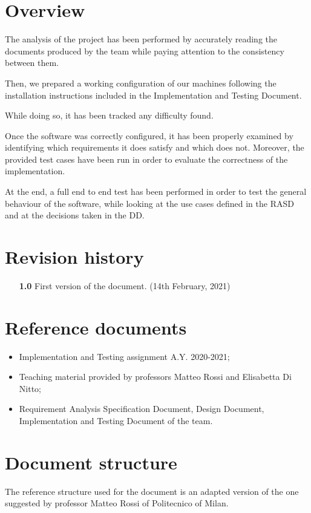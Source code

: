 \documentclass[a4paper,oneside,11pt]{book}
\begin{document}
    \section{Overview}
    The analysis of the project has been performed by accurately reading the documents produced by the team while paying attention to the consistency between them. \par
    Then, we prepared a working configuration of our machines following the installation instructions included in the Implementation and Testing Document. \par
    While doing so, it has been tracked any difficulty found. \par
    Once the software was correctly configured, it has been properly examined by identifying which requirements it does satisfy and which does not. Moreover, the provided test cases have been run in order to evaluate the correctness of the implementation. \par
    At the end, a full end to end test has been performed in order to test the general behaviour of the software, while looking at the use cases defined in the RASD and at the decisions taken in the DD.
    
    \section{Revision history}
    \begin{itemize}
        \item[\textbf{1.0}] First version of the document. (14th February, 2021)
    \end{itemize}
    
    \section{Reference documents}
    \begin{itemize}
        \item Implementation and Testing assignment A.Y. 2020-2021;
        \item Teaching material provided by professors Matteo Rossi and Elisabetta Di Nitto;
        \item Requirement Analysis Specification Document, Design Document, Implementation and Testing Document of the team.
    \end{itemize}
    
    \section{Document structure}
    The reference structure used for the document is an adapted version of the one suggested by professor Matteo Rossi of Politecnico of Milan.
    
\end{document}
